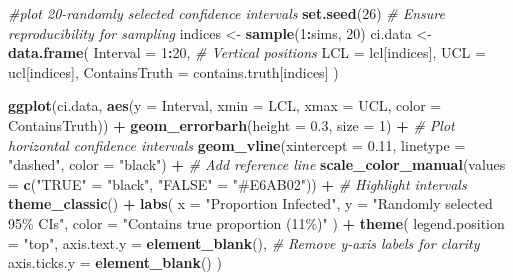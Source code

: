 \documentclass[
]{book}
\newenvironment{Shaded}{\begin{snugshade}}{\end{snugshade}}
\newcommand{\AttributeTok}[1]{\textcolor[rgb]{0.13,0.29,0.53}{#1}}
\newcommand{\CommentTok}[1]{\textcolor[rgb]{0.56,0.35,0.01}{\textit{#1}}}
\newcommand{\DecValTok}[1]{\textcolor[rgb]{0.00,0.00,0.81}{#1}}
\newcommand{\FloatTok}[1]{\textcolor[rgb]{0.00,0.00,0.81}{#1}}
\newcommand{\FunctionTok}[1]{\textcolor[rgb]{0.13,0.29,0.53}{\textbf{#1}}}
\newcommand{\NormalTok}[1]{#1}
\newcommand{\OtherTok}[1]{\textcolor[rgb]{0.56,0.35,0.01}{#1}}
\newcommand{\SpecialCharTok}[1]{\textcolor[rgb]{0.81,0.36,0.00}{\textbf{#1}}}
\newcommand{\StringTok}[1]{\textcolor[rgb]{0.31,0.60,0.02}{#1}}
\begin{document}
\begin{Shaded}
\begin{Highlighting}[]
\CommentTok{\#plot 20{-}randomly selected confidence intervals}
\FunctionTok{set.seed}\NormalTok{(}\DecValTok{26}\NormalTok{) }\CommentTok{\# Ensure reproducibility for sampling}
\NormalTok{indices }\OtherTok{\textless{}{-}} \FunctionTok{sample}\NormalTok{(}\DecValTok{1}\SpecialCharTok{:}\NormalTok{sims, }\DecValTok{20}\NormalTok{)}
\NormalTok{ci.data }\OtherTok{\textless{}{-}} \FunctionTok{data.frame}\NormalTok{(}
  \AttributeTok{Interval =} \DecValTok{1}\SpecialCharTok{:}\DecValTok{20}\NormalTok{,  }\CommentTok{\# Vertical positions}
  \AttributeTok{LCL =}\NormalTok{ lcl[indices],}
  \AttributeTok{UCL =}\NormalTok{ ucl[indices],}
  \AttributeTok{ContainsTruth =}\NormalTok{ contains.truth[indices]}
\NormalTok{)}

\FunctionTok{ggplot}\NormalTok{(ci.data, }\FunctionTok{aes}\NormalTok{(}\AttributeTok{y =}\NormalTok{ Interval, }\AttributeTok{xmin =}\NormalTok{ LCL, }\AttributeTok{xmax =}\NormalTok{ UCL, }\AttributeTok{color =}\NormalTok{ ContainsTruth)) }\SpecialCharTok{+}
  \FunctionTok{geom\_errorbarh}\NormalTok{(}\AttributeTok{height =} \FloatTok{0.3}\NormalTok{, }\AttributeTok{size =} \DecValTok{1}\NormalTok{) }\SpecialCharTok{+}  \CommentTok{\# Plot horizontal confidence intervals}
  \FunctionTok{geom\_vline}\NormalTok{(}\AttributeTok{xintercept =} \FloatTok{0.11}\NormalTok{, }\AttributeTok{linetype =} \StringTok{"dashed"}\NormalTok{, }\AttributeTok{color =} \StringTok{"black"}\NormalTok{) }\SpecialCharTok{+}  \CommentTok{\# Add reference line}
  \FunctionTok{scale\_color\_manual}\NormalTok{(}\AttributeTok{values =} \FunctionTok{c}\NormalTok{(}\StringTok{"TRUE"} \OtherTok{=} \StringTok{"black"}\NormalTok{, }\StringTok{"FALSE"} \OtherTok{=} \StringTok{"\#E6AB02"}\NormalTok{)) }\SpecialCharTok{+}  \CommentTok{\# Highlight intervals}
  \FunctionTok{theme\_classic}\NormalTok{() }\SpecialCharTok{+}
  \FunctionTok{labs}\NormalTok{(}
    \AttributeTok{x =} \StringTok{"Proportion Infected"}\NormalTok{,}
    \AttributeTok{y =} \StringTok{"Randomly selected 95\% CIs"}\NormalTok{,}
    \AttributeTok{color =} \StringTok{"Contains true proportion (11\%)"}
\NormalTok{  ) }\SpecialCharTok{+}
  \FunctionTok{theme}\NormalTok{(}
    \AttributeTok{legend.position =} \StringTok{"top"}\NormalTok{,}
    \AttributeTok{axis.text.y =} \FunctionTok{element\_blank}\NormalTok{(),  }\CommentTok{\# Remove y{-}axis labels for clarity}
    \AttributeTok{axis.ticks.y =} \FunctionTok{element\_blank}\NormalTok{()}
\NormalTok{  )}
\end{Highlighting}
\end{Shaded}
\end{document}
